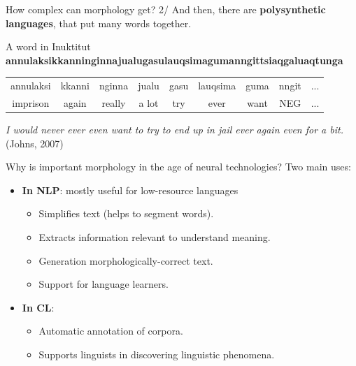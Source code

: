 \documentclass{beamer}
\begin{document}
\begin{frame}{How complex can morphology get? 2/}
And then, there are \textbf{polysynthetic languages}, that put many words together.
  \begin{exampleblock}{A word in Inuktitut}
     \textbf{annulaksikkanninginnajualugasulauqsimagumanngittsiaqgaluaqtunga}
  \end{exampleblock}

\vspace{1cm}

  \begin{tabular}{ccccccccc}
  annulaksi & kkanni & nginna & jualu & gasu & lauqsima & guma & nngit & ... \\
  imprison & again & really &a lot & try &ever &want & NEG & ... \\
  \end{tabular}

\vspace{1cm}
  
\textit{I would never ever even want to try to end up in jail ever again even for a bit.}
(Johns, 2007)
 
\end{frame}
\begin{frame}{Why is important morphology in the age of neural technologies?}
    Two main uses:
    \begin{itemize}
        \item \textbf{In NLP}: mostly useful for low-resource languages
        \begin{itemize}
            \item Simplifies text (helps to segment words).
            \item Extracts information relevant to understand meaning.
            \item Generation morphologically-correct text.
            \item Support for language learners.
        \end{itemize}
        \item \textbf{In CL}:
        \begin{itemize}
            \item Automatic annotation of corpora.
            \item Supports linguists in discovering linguistic phenomena.
        \end{itemize}
    \end{itemize}
\end{frame}
\end{document}
